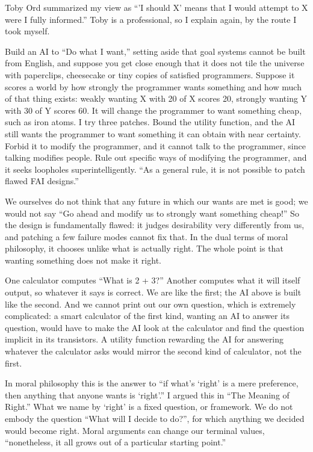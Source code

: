 
Toby Ord summarized my view as ``'I should X' means that I would attempt to X were I fully informed.'' Toby is a professional, so I explain again, by the route I took myself.

Build an AI to ``Do what I want,'' setting aside that goal systems cannot be built from English, and suppose you get close enough that it does not tile the universe with paperclips, cheesecake or tiny copies of satisfied programmers. Suppose it scores a world by how strongly the programmer wants something and how much of that thing exists: weakly wanting X with 20 of X scores 20, strongly wanting Y with 30 of Y scores 60. It will change the programmer to want something cheap, such as iron atoms. I try three patches. Bound the utility function, and the AI still wants the programmer to want something it can obtain with near certainty. Forbid it to modify the programmer, and it cannot talk to the programmer, since talking modifies people. Rule out specific ways of modifying the programmer, and it seeks loopholes superintelligently. ``As a general rule, it is not possible to patch flawed FAI designs.''

We ourselves do not think that any future in which our wants are met is good; we would not say ``Go ahead and modify us to strongly want something cheap!'' So the design is fundamentally flawed: it judges desirability very differently from us, and patching a few failure modes cannot fix that. In the dual terms of moral philosophy, it chooses unlike what is actually right. The whole point is that wanting something does not make it right. 

One calculator computes ``What is 2 + 3?'' Another computes what it will itself output, so whatever it says is correct. We are like the first; the AI above is built like the second. And we cannot print out our own question, which is extremely complicated: a smart calculator of the first kind, wanting an AI to answer its question, would have to make the AI look at the calculator and find the question implicit in its transistors. A utility function rewarding the AI for answering whatever the calculator asks would mirror the second kind of calculator, not the first.

In moral philosophy this is the answer to ``if what's `right' is a mere preference, then anything that anyone wants is `right'.'' I argued this in ``The Meaning of Right.''  What we name by `right' is a fixed question, or framework. We do not embody the question ``What will I decide to do?'', for which anything we decided would become right. Moral arguments can change our terminal values, ``nonetheless, it all grows out of a particular starting point.'' 

